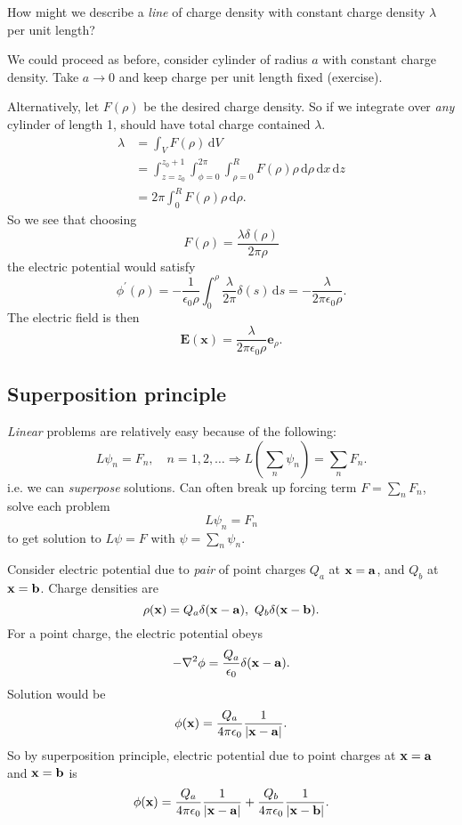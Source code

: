 \begin{example}
    How might we describe a \textit{line} of charge density with constant charge density $ \lambda $ per unit length?

    We could proceed as before, consider cylinder of radius $a$ with constant charge density. Take $a\to 0$ and keep charge per unit length fixed (exercise).

    Alternatively, let $ F(\rho) $ be the desired charge density. So if we integrate over \textit{any} cylinder of length 1, should have total charge contained $ \lambda $.
    \begin{align*}
        \lambda&= \int_{V} F(\rho) \,\mathrm{d}V\\ 
        &= \int_{z=z_0}^{z_0+1} \int_{\phi=0}^{2\pi} \int_{\rho=0}^{R} F(\rho)\rho \,\mathrm{d}\rho \,\mathrm{d}x \,\mathrm{d}z\\ 
        &= 2\pi \int_{0}^{R} F(\rho)\rho \,\mathrm{d}\rho .
    \end{align*}
    So we see that choosing 
    \[
        F(\rho)=\frac{\lambda \delta(\rho)}{2\pi \rho}
    \]
    the electric potential would satisfy
    \[
        \phi^{\prime}(\rho)=-\frac{1}{\epsilon_{0} \rho} \int_{0}^{\rho} \frac{\lambda}{2 \pi} \delta(s) \,\mathrm{d} s=-\frac{\lambda}{2 \pi \epsilon_{0} \rho}.
    \]
    The electric field is then
    \[
        \mathbf{E}(\mathbf{x})=\frac{\lambda}{2 \pi \epsilon_{0} \rho} \mathbf{e}_{\rho}.
    \]
\end{example}

\subsection{Superposition principle}
\textit{Linear} problems are relatively easy because of the following: 
\[
    L \psi_n = F_n,\quad n=1,2,\dots \Longrightarrow 
    L\left( \sum_{n} \psi_n \right) = \sum_{n} F_n.
\]
i.e. we can \textit{superpose} solutions. Can often break up forcing term $ F=\sum_n F_n $, solve each problem 
\[
    L \psi_n=F_n
\]
to get solution to $ L \psi=F $ with $ \psi=\sum_n \psi_n $.

\begin{example}
    Consider electric potential due to \textit{pair} of point charges $ Q_a $ at $ {\bf x}={\bf a} $, and $ Q_b $ at $ {\bf x}={\bf b} $. Charge densities are
    \[
        \rho({\bf x})=Q_a \delta({\bf x}-{\bf a}),\ Q_b \delta({\bf x}-{\bf b}).
    \]
    For a point charge, the electric potential obeys 
    \[
        -\laplacian \phi = \frac{Q_a}{\epsilon_0}\delta(\bfx-\bfa).
    \]
    Solution would be 
    \[
        \phi({\bf x}) = \frac{Q_a}{4\pi \epsilon_0}\frac{1}{|{\bf x}-{\bf a}|}.
    \]
    So by superposition principle, electric potential due to point charges at $ {\bf x}={\bf a} $ and $ {\bf x}={\bf b} $ is 
    \[
        \phi({\bf x})=\frac{Q_a}{4\pi \epsilon_0}\frac{1}{|{\bf x}-{\bf a}|}+\frac{Q_b}{4\pi \epsilon_0}\frac{1}{|{\bf x}-{\bf b}|}.
    \]
\end{example}

